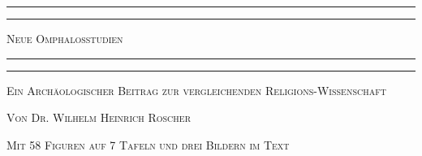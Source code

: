 \documentclass[a4paper, 11pt, oneside]{article}
\begin{document}
\renewcommand{\thefigure}{\frakfamily{\arabic{figure}}}
\renewcommand\thefootnote{\frakfamily{\arabic{footnote}}}
\let\oldfootnote\footnote
    \renewcommand{\footnote}[1]{\oldfootnote{\frakfamily\large#1}}
\begin{titlepage} %
	\centering %

	
	\rule{\textwidth}{1.6pt}\vspace*{-\baselineskip}\vspace*{2pt} %
	\rule{\textwidth}{0.4pt} %
	
	\vspace{1\baselineskip} %
	
	{\scshape\Huge Neue Omphalosstudien}
	
	\vspace{1\baselineskip} %

	\rule{\textwidth}{0.4pt}\vspace*{-\baselineskip}\vspace{3.2pt} %
	\rule{\textwidth}{1.6pt} %
	
	\vspace{1\baselineskip} %
	
	
	{\scshape Ein Archäologischer Beitrag zur vergleichenden Religions-Wissenschaft} %
	
	\vspace*{1\baselineskip} %

        {\scshape Von \Large Dr. Wilhelm Heinrich Roscher}

	\vspace*{4\baselineskip} %

        {\scshape\small Mit 58 Figuren auf 7 Tafeln und drei Bildern im Text}

	\vspace{1\baselineskip}

        \vspace*{\fill}


\end{titlepage}
\end{document}
